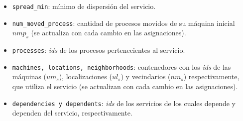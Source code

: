 \documentclass[../informe2.tex]{subfiles}
\begin{document}
\noindent\begin{minipage}{0.5\textwidth}
	\small
	\begin{itemize}[leftmargin=*]
		\item \texttt{spread\_min}: mínimo de dispersión del servicio.
		\item \texttt{num\_moved\_process}: cantidad de procesos movidos de su máquina inicial $nmp_s$ (se actualiza con cada cambio en las asignaciones).
		\item \texttt{processes}: \textit{ids} de los procesos pertenecientes al servicio.
 		\item \texttt{machines, locations, neighborhoods}: contenedores con los \textit{ids} de las máquinas ($um_s$), localizaciones ($ul_s$) y vecindarios ($nm_s$) respectivamente, que utiliza el servicio (se actualizan con cada cambio en las asignaciones).
 		\item \texttt{dependencies y dependents}: \textit{ids} de los servicios de los cuales depende y dependen del servicio, respectivamente.
	\end{itemize}
\end{minipage}\hfill
\begin{minipage}{0.4\textwidth}
\end{minipage}

\vspace{0.75cm}
\end{document}
